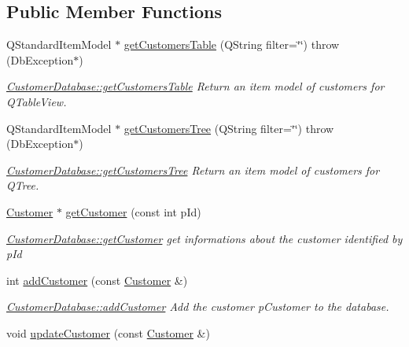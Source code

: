 \subsection*{Public Member Functions}
\begin{DoxyCompactItemize}
\item 
Q\-Standard\-Item\-Model $\ast$ \hyperlink{classCustomerDatabase_a2e25b4f197ccbdd2c5753558dbe18d4b}{get\-Customers\-Table} (Q\-String filter=\char`\"{}\char`\"{})  throw (\-Db\-Exception$\ast$)
\begin{DoxyCompactList}\small\item\em \hyperlink{classCustomerDatabase_a2e25b4f197ccbdd2c5753558dbe18d4b}{Customer\-Database\-::get\-Customers\-Table} Return an item model of customers for Q\-Table\-View. \end{DoxyCompactList}\item 
Q\-Standard\-Item\-Model $\ast$ \hyperlink{classCustomerDatabase_a0fc1ca7fe1020cef19b2423531c4e934}{get\-Customers\-Tree} (Q\-String filter=\char`\"{}\char`\"{})  throw (\-Db\-Exception$\ast$)
\begin{DoxyCompactList}\small\item\em \hyperlink{classCustomerDatabase_a0fc1ca7fe1020cef19b2423531c4e934}{Customer\-Database\-::get\-Customers\-Tree} Return an item model of customers for Q\-Tree. \end{DoxyCompactList}\item 
\hyperlink{classCustomer}{Customer} $\ast$ \hyperlink{classCustomerDatabase_ae510e11ab1efe33b8e1da21bc1ca6f2d}{get\-Customer} (const int p\-Id)
\begin{DoxyCompactList}\small\item\em \hyperlink{classCustomerDatabase_ae510e11ab1efe33b8e1da21bc1ca6f2d}{Customer\-Database\-::get\-Customer} get informations about the customer identified by {\itshape p\-Id} \end{DoxyCompactList}\item 
int \hyperlink{classCustomerDatabase_a522337809fe7588ddc8b5eb27b0cb640}{add\-Customer} (const \hyperlink{classCustomer}{Customer} \&)
\begin{DoxyCompactList}\small\item\em \hyperlink{classCustomerDatabase_a522337809fe7588ddc8b5eb27b0cb640}{Customer\-Database\-::add\-Customer} Add the customer {\itshape p\-Customer} to the database. \end{DoxyCompactList}\item 
\hypertarget{classCustomerDatabase_a2ae17af9bcbf889dec21b4acae3161e1}{void \hyperlink{classCustomerDatabase_a2ae17af9bcbf889dec21b4acae3161e1}{update\-Customer} (const \hyperlink{classCustomer}{Customer} \&)}\label{classCustomerDatabase_a2ae17af9bcbf889dec21b4acae3161e1}


\end{DoxyCompactItemize}

